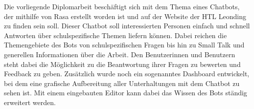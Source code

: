 Die vorliegende Diplomarbeit beschäftigt sich mit dem Thema eines Chatbots, der mithilfe von Rasa erstellt worden ist und auf der Website der HTL Leonding zu finden sein soll.
Dieser Chatbot soll interessierten Personen einfach und schnell Antworten über schulspezifische Themen liefern können.
Dabei reichen die Themengebiete des Bots von schulspezifischen Fragen bis hin zu Small Talk und generellen Informationen über die Arbeit.
Den Benutzerinnen und Benutzern steht dabei die Möglichkeit zu die Beantwortung ihrer Fragen zu bewerten und Feedback zu geben.
Zusätzlich wurde noch ein sogenanntes Dashboard entwickelt, bei dem eine grafische Aufbereitung aller Unterhaltungen mit dem Chatbot zu sehen ist.
Mit einem eingebauten Editor kann dabei das Wissen des Bots ständig erweitert werden.
